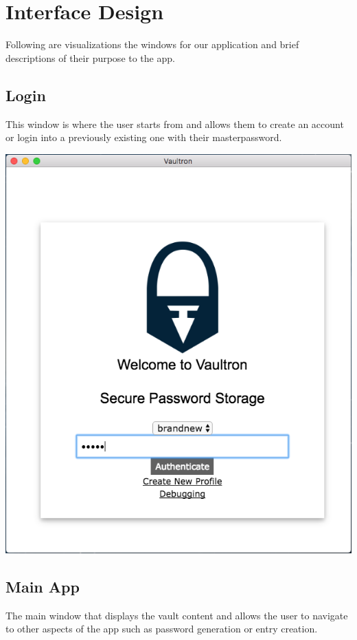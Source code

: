 \documentclass[11pt]{report}
\begin{document}
\section{Interface Design}
Following are visualizations the windows for our application and brief 
descriptions of their purpose to the app.

\subsection{Login}
This window is where the user starts from and allows them to create an account
or login into a previously existing one with their masterpassword.

\begin{center}
\includegraphics[scale=0.50]{app-login-demo.png}
\end{center}

\subsection{Main App}
The main window that displays the vault content and allows the user to navigate
to other aspects of the app such as password generation or entry creation.
\end{document}
